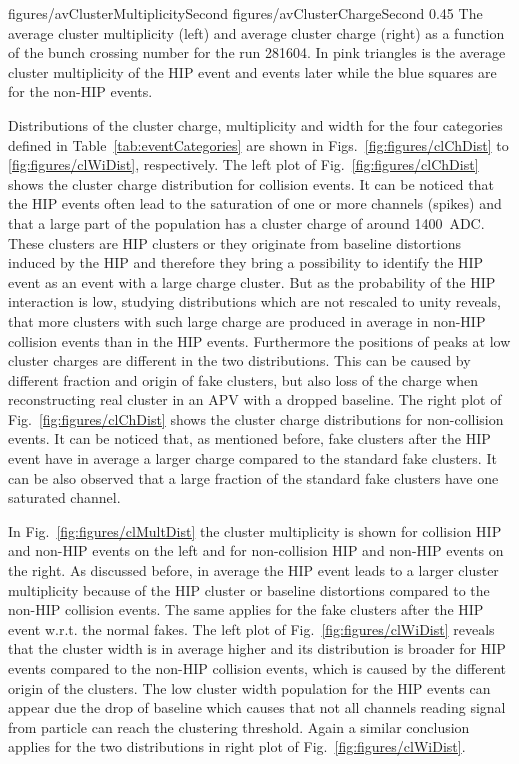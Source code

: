                  {figures/avClusterMultiplicitySecond} %
                 {figures/avClusterChargeSecond} %
                 {0.45}       %
                 { The average cluster multiplicity (left) and average cluster charge (right) as a function of the bunch crossing number for the run 281604. In pink triangles is the average cluster multiplicity of the HIP event and events later while the blue squares are for the non-HIP events.  } %



Distributions of the cluster charge, multiplicity and width for the four categories defined in Table~\ref{tab:eventCategories} are shown in Figs.~\ref{fig:figures/clChDist} to \ref{fig:figures/clWiDist}, respectively. The left plot of Fig.~\ref{fig:figures/clChDist} shows the cluster charge distribution for collision events. It can be noticed that the HIP events often lead to the saturation of one or more channels (spikes) and that  a large part of the population has a cluster charge of around 1400~ADC. These clusters are HIP clusters or they originate from baseline distortions induced by the HIP and therefore they bring a possibility to identify the HIP event as an event with a large charge cluster. But as the probability of the HIP interaction is low, studying distributions which are not rescaled to unity reveals, that  more clusters with such large charge are produced in average in non-HIP collision events than in the HIP events. Furthermore the positions of peaks at low cluster charges are different in the two distributions. This can be caused by different fraction and origin of fake clusters, but also loss of the charge when reconstructing real cluster in an APV with a dropped baseline. The right plot of Fig.~\ref{fig:figures/clChDist} shows the cluster charge distributions for non-collision events. It can be noticed that, as mentioned before, fake clusters after the HIP event have in average a larger charge compared to the standard fake clusters. It can be also observed that a large fraction of the standard fake clusters have one saturated channel. 

In Fig.~\ref{fig:figures/clMultDist} the cluster multiplicity is shown for collision HIP and non-HIP events on the left and for  non-collision HIP and non-HIP events on the right. As discussed before, in average the HIP event leads to a larger cluster multiplicity because of the HIP cluster or baseline distortions compared to the non-HIP collision events. The same applies for the fake clusters after the HIP event w.r.t. the normal fakes. The left plot of Fig.~\ref{fig:figures/clWiDist} reveals that the cluster width is in average higher and its distribution is broader for HIP events compared to the non-HIP collision events, which is caused by the different origin of the clusters. The low cluster width population for the HIP events can appear due the drop of baseline which causes that not all channels reading signal from particle can reach the clustering threshold. Again a similar conclusion applies for the two distributions in right plot of Fig.~\ref{fig:figures/clWiDist}.  

